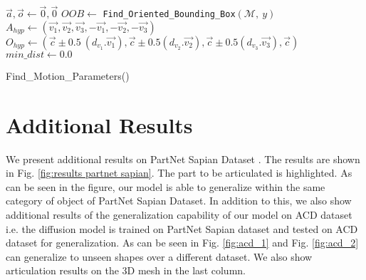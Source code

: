 \begin{algorithm}
    \BlankLine
    {$\Vec{a}, \Vec{o} \leftarrow \Vec{0}, \Vec{0}$}\;
    $OOB \leftarrow$ \texttt{Find\_Oriented\_Bounding\_Box}$(\mathcal{M}, \ y)$ \;
    $A_{hyp} \leftarrow (\Vec{v_{1}},\Vec{v_{2}},\Vec{v_{3}},-\Vec{v_{1}},-\Vec{v_{2}},-\Vec{v_{3}})$\; 
    $O_{hyp} \leftarrow (\Vec{c} \pm 0.5 \ (d_{v_{1}}.\Vec{v_{1}}), \Vec{c} \pm 0.5(d_{v_{2}}.\Vec{v_{2}}),\Vec{c} \pm 0.5(d_{v_{3}}.\Vec{v_{3}}), \Vec{c})$\;
    $min\_dist \leftarrow 0.0$\;  
    \caption{Find\_Motion\_Parameters()}
    \label{alg:find_motion_parameters}
\end{algorithm}

\section{Additional Results}
We present additional results on PartNet Sapian Dataset \cite{xiang2020sapien}. The results are shown in Fig. \ref{fig:results partnet sapian}. The part to be articulated is highlighted. As can be seen in the figure, our model is able to generalize within the same category of object of PartNet Sapian Dataset. In addition to this, we also show additional results of the generalization capability of our model on ACD dataset \cite{iliash2024s2o} i.e. the diffusion model is trained on PartNet Sapian dataset and tested on ACD dataset for generalization. As can be seen in Fig. \ref{fig:acd_1} and Fig. \ref{fig:acd_2} can generalize to unseen shapes over a different dataset. We also show articulation results on the 3D mesh in the last column.

\newpage


\newpage
